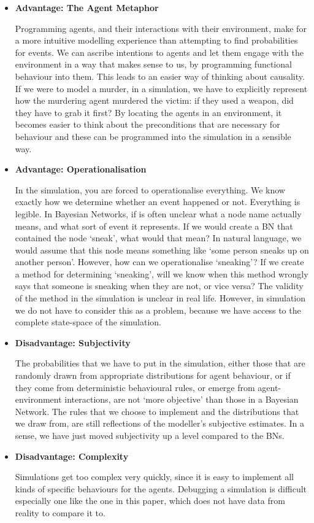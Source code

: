 \documentclass[12pt]{article}
\begin{document}
\begin{itemize}
\item \textbf{Advantage: The Agent Metaphor}

Programming agents, and their interactions with their environment, make for a more intuitive modelling experience than attempting to find probabilities for events. We can ascribe intentions to agents and let them engage with the environment in a way that makes sense to us, by programming functional behaviour into them. This leads to an easier way of thinking about causality. If we were to model a murder, in a simulation, we have to explicitly represent how the murdering agent murdered the victim: if they used a weapon, did they have to grab it first? By locating the agents in an environment, it becomes easier to think about the preconditions that are necessary for behaviour and these can be programmed into the simulation in a sensible way.

\item \textbf{Advantage: Operationalisation}

In the simulation, you are forced to operationalise everything. We know exactly how we determine whether an event happened or not. Everything is legible. In Bayesian Networks, if is often unclear what a node name actually means, and what sort of event it represents. If we would create a BN that contained the node `sneak', what would that mean? In natural language, we would assume that this node means something like `some person sneaks up on another person'. However, how can we operationalise `sneaking'? If we create a method for determining `sneaking', will we know when this method wrongly says that someone is sneaking when they are not, or vice versa? The validity of the method in the simulation is unclear in real life. However, in simulation we do not have to consider this as a problem, because we have access to the complete state-space of the simulation.


\item \textbf{Disadvantage: Subjectivity}

The probabilities that we have to put in the simulation, either those that are randomly drawn from appropriate distributions for agent behaviour, or if they come from deterministic behavioural rules, or emerge from agent-environment interactions, are not `more objective' than those in a Bayesian Network. The rules that we choose to implement and the distributions that we draw from, are still reflections of the modeller's subjective estimates. In a sense, we have just moved subjectivity up a level compared to the BNs.


\item \textbf{Disadvantage: Complexity}

Simulations get too complex very quickly, since it is easy to implement all kinds of specific behaviours for the agents. Debugging a simulation is difficult especially one like the one in this paper, which does not have data from reality to compare it to.

\end{itemize}
\end{document}
